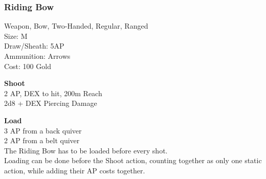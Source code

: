 \subsubsection{Riding Bow}\label{weapon:ridingBow}
Weapon, Bow, Two-Handed, Regular, Ranged\\
Size: M\\
Draw/Sheath: 5AP\\
Ammunition: Arrows\\
Cost: 100 Gold

\textbf{Shoot}\\
2 AP, DEX to hit, 200m Reach\\
2d8 + \texttimes DEX Piercing Damage

\textbf{Load}\\
3 AP from a back quiver\\
2 AP from a belt quiver\\
The Riding Bow has to be loaded before every shot.\\
Loading can be done before the Shoot action, counting together as only one static action, while adding their AP costs together.

